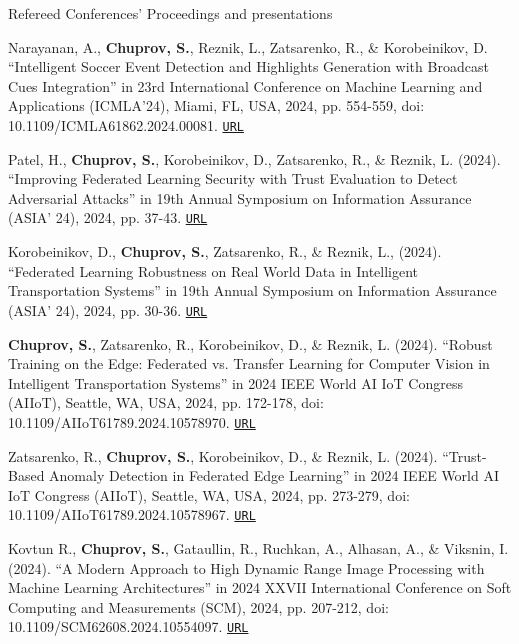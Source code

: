 \begin{rSection}{Refereed Conferences' Proceedings and presentations}
\begin{enumerate}[label=[C{{\arabic*}]}]
\item Narayanan, A., \textbf{Chuprov, S.}, Reznik, L., Zatsarenko, R., \& Korobeinikov, D. ``Intelligent Soccer Event Detection and Highlights Generation with Broadcast Cues Integration'' in 23rd International Conference on Machine Learning and Applications (ICMLA'24), Miami, FL, USA, 2024, pp. 554-559, doi: 10.1109/ICMLA61862.2024.00081. \href{https://ieeexplore.ieee.org/abstract/document/10903485}{\nolinkurl{URL}}  

\item Patel, H., \textbf{Chuprov, S.}, Korobeinikov, D., Zatsarenko, R., \& Reznik, L. (2024). ``Improving Federated Learning Security with Trust Evaluation to Detect Adversarial Attacks'' in 19th Annual Symposium on Information Assurance (ASIA’ 24), 2024, pp. 37-43.   
\href{https://par.nsf.gov/biblio/10532526}{\nolinkurl{URL}}

\item Korobeinikov, D., \textbf{Chuprov, S.}, Zatsarenko, R., \& Reznik, L., (2024). ``Federated Learning Robustness on Real World Data in Intelligent Transportation Systems'' in 19th Annual Symposium on Information Assurance (ASIA’ 24), 2024, pp. 30-36.   
\href{https://par.nsf.gov/biblio/10532530}{\nolinkurl{URL}}

\item \textbf{Chuprov, S.}, Zatsarenko, R., Korobeinikov, D., \& Reznik, L. (2024). ``Robust Training on the Edge: Federated vs. Transfer Learning for Computer Vision in Intelligent Transportation Systems'' in 2024 IEEE World AI IoT Congress (AIIoT), Seattle, WA, USA, 2024, pp. 172-178, doi: 10.1109/AIIoT61789.2024.10578970. \href{https://ieeexplore.ieee.org/abstract/document/10578970}{\nolinkurl{URL}}

\item Zatsarenko, R., \textbf{Chuprov, S.}, Korobeinikov, D., \& Reznik, L. (2024). ``Trust-Based Anomaly Detection in Federated Edge Learning'' in 2024 IEEE World AI IoT Congress (AIIoT), Seattle, WA, USA, 2024, pp. 273-279, doi: 10.1109/AIIoT61789.2024.10578967. \href{https://ieeexplore.ieee.org/abstract/document/10578967}{\nolinkurl{URL}}

\item Kovtun R., \textbf{Chuprov, S.}, Gataullin, R., Ruchkan, A., Alhasan, A., \& Viksnin, I. (2024). ``A Modern Approach to High Dynamic Range Image Processing with Machine Learning Architectures'' in 2024 XXVII International Conference on Soft Computing and Measurements (SCM), 2024, pp. 207-212, doi: 10.1109/SCM62608.2024.10554097. \href{https://ieeexplore-ieee-org.ezproxy.rit.edu/document/10554097}{\nolinkurl{URL}} 


\end{enumerate}
\end{rSection}
